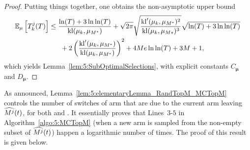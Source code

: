 \begin{proof}
  Putting things together, one obtains the non-asymptotic upper bound
  \begin{align}\label{eq:5:UBprecise}
    \mathbb{E}_{\mu}\left[T_k^j(T)\right]
    & \leq \frac{\ln(T) + 3 \ln\ln(T)}{\mathrm{kl}(\mu_k,\mu_{M^*})} + \sqrt{2\pi} \sqrt{\frac{\mathrm{kl}'(\mu_k,\mu_{M^*})^2}{\mathrm{kl}(\mu_k,\mu_{M*})^3}}\sqrt{\ln(T) + 3\ln\ln(T)}  \nonumber\\
    & \;\;\;\;\;\;+ 2\left(\frac{\mathrm{kl}'(\mu_k,\mu_{M^*})}{\mathrm{kl}(\mu_k,\mu_{M^*})}\right)^2 + 4Me \ln\ln(T) + 3M+1,
  \end{align}
  which yields Lemma~\ref{lem:5:SubOptimalSelections},
  with explicit constants $C_{\boldsymbol{\mu}}$ and $D_{\boldsymbol{\mu}}$.
\end{proof}






As announced, Lemma~\ref{lem:5:elementaryLemma_RandTopM_MCTopM} controls
the number of switches of arm that are due to the current arm leaving $\widehat{M^j}(t)$,
for both \RandTopM{} and \MCTopM{}. It essentially proves that Lines~$3$-$5$ in Algorithm~\ref{algo:5:MCTopM} (when a new arm is sampled from the non-empty subset of $\widehat{M^j}(t)$)
happen a logarithmic number of times. The proof of this result is given below.

